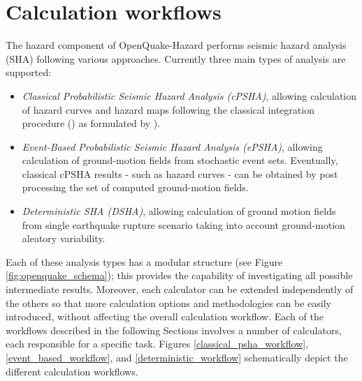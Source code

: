 \section{Calculation workflows}
The hazard component of OpenQuake-Hazard performs seismic hazard 
analysis (SHA) following various approaches. 
%
Currently three main types of analysis are supported:
\begin{itemize}
\item \textit{Classical Probabilistic Seismic Hazard Analysis (cPSHA)}, 
allowing calculation of hazard curves and hazard maps following the 
classical integration procedure 
(\cite{cornell1968}) as formulated by \cite{field2003}).
\item \textit{Event-Based Probabilistic Seismic Hazard Analysis (ePSHA)}, 
allowing calculation of ground-motion fields from stochastic event sets. 
Eventually, classical cPSHA results - such as hazard curves - can be 
obtained by post processing the set of computed ground-motion fields.
\item \textit{Deterministic SHA (DSHA)}, allowing calculation of ground 
motion fields from single earthquake rupture scenario taking into account 
ground-motion aleatory variability.
\end{itemize}
Each of these analysis types has a modular structure (see Figure 
\ref{fig:openquake_schema}); this provides the capability of investigating 
all possible intermediate results. Moreover, each calculator can be 
extended independently of the others so that more calculation 
options and methodologies can be easily introduced, without affecting the 
overall calculation workflow. 
Each of the workflows described in the following Sections involves a number 
of calculators, each responsible for a specific task. 
Figures \ref{classical_psha_workflow}, \ref{event_based_workflow}, and 
\ref{deterministic_workflow} schematically depict the different calculation 
workflows.
%
